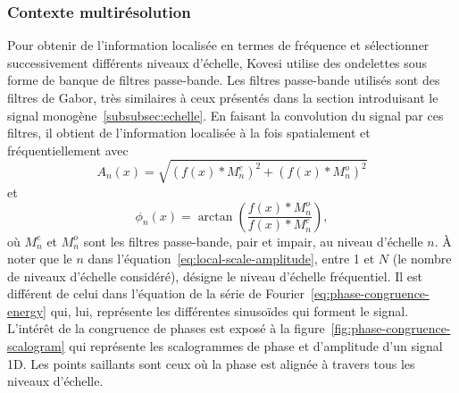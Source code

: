 \subsubsection{Contexte multirésolution}

Pour obtenir de l'information localisée en termes de fréquence et sélectionner successivement différents niveaux d'échelle, Kovesi utilise des ondelettes sous forme de banque de filtres passe-bande. Les filtres passe-bande utilisés sont des filtres de Gabor, très similaires à ceux présentés dans la section introduisant le signal monogène~\ref{subsubsec:echelle}. En faisant la convolution du signal par ces filtres, il obtient de l'information localisée à la fois spatialement et fréquentiellement avec
\begin{equation}
    A_n(x) = \sqrt{(f(x)*M^e_n)^2 + (f(x)*M^o_n)^2}
    \label{eq:local-scale-amplitude}
\end{equation}
et
\begin{equation}
    \phi_n(x) = \arctan\left(\frac{f(x)*M^o_n}{f(x)*M^e_n}\right),
\end{equation}
où $M^e_n$ et $M^o_n$ sont les filtres passe-bande, pair et impair, au niveau d'échelle $n$. À noter que le $n$ dans l'équation~\ref{eq:local-scale-amplitude}, entre 1 et $N$ (le nombre de niveaux d'échelle considéré), désigne le niveau d'échelle fréquentiel. Il est différent de celui dans l'équation de la série de Fourier~\ref{eq:phase-congruence-energy} qui, lui, représente les différentes sinusoïdes qui forment le signal. L'intérêt de la congruence de phases est exposé à la figure~\ref{fig:phase-congruence-scalogram} qui représente les scalogrammes de phase et d'amplitude d'un signal 1D. Les points saillants sont ceux où la phase est alignée à travers tous les niveaux d'échelle.

\bigskip

